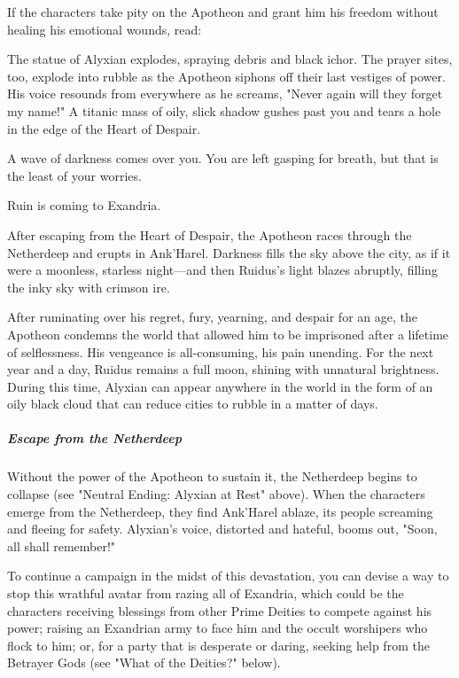 \documentclass[10pt,a4paper,twoside,fancy,bg=print,twocolumn,openany,nodeprecatedcode]{dndbook}
\begin{document}
If the characters take pity on the Apotheon and grant him his freedom without healing his emotional wounds, read:

\begin{DndReadAloud}{}
The statue of Alyxian explodes, spraying debris and black ichor. The prayer sites, too, explode into rubble as the Apotheon siphons off their last vestiges of power. His voice resounds from everywhere as he screams, "Never again will they forget my name!" A titanic mass of oily, slick shadow gushes past you and tears a hole in the edge of the Heart of Despair.

A wave of darkness comes over you. You are left gasping for breath, but that is the least of your worries.

Ruin is coming to Exandria.

\end{DndReadAloud}

After escaping from the Heart of Despair, the Apotheon races through the Netherdeep and erupts in Ank'Harel. Darkness fills the sky above the city, as if it were a moonless, starless night—and then Ruidus's light blazes abruptly, filling the inky sky with crimson ire.

After ruminating over his regret, fury, yearning, and despair for an age, the Apotheon condemns the world that allowed him to be imprisoned after a lifetime of selflessness. His vengeance is all-consuming, his pain unending. For the next year and a day, Ruidus remains a full moon, shining with unnatural brightness. During this time, Alyxian can appear anywhere in the world in the form of an oily black cloud that can reduce cities to rubble in a matter of days.

\subparagraph{Escape from the Netherdeep}
Without the power of the Apotheon to sustain it, the Netherdeep begins to collapse (see "Neutral Ending: Alyxian at Rest" above). When the characters emerge from the Netherdeep, they find Ank'Harel ablaze, its people screaming and fleeing for safety. Alyxian's voice, distorted and hateful, booms out, "Soon, all shall remember!"

To continue a campaign in the midst of this devastation, you can devise a way to stop this wrathful avatar from razing all of Exandria, which could be the characters receiving blessings from other Prime Deities to compete against his power; raising an Exandrian army to face him and the occult worshipers who flock to him; or, for a party that is desperate or daring, seeking help from the Betrayer Gods (see "What of the Deities?" below).
\end{document}
